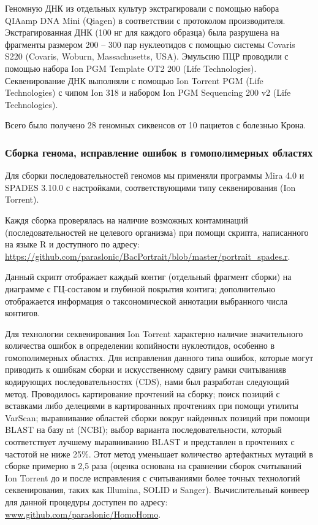 Геномную ДНК из отдельных культур экстрагировали с помощью набора QIAamp DNA Mini (Qiagen) в соответствии с протоколом производителя. Экстрагированная ДНК (100 нг для каждого образца) была разрушена на фрагменты размером 200 – 300 пар нуклеотидов с помощью системы Covaris S220 (Covaris, Woburn, Massachusetts, USA). Эмульсию ПЦР проводили с помощью набора Ion PGM Template OT2 200 (Life Technologies). Секвенирование ДНК выполняли с помощью Ion Torrent PGM (Life Technologies) с чипом Ion 318 и набором Ion PGM Sequencing 200 v2 (Life Technologies). 

Всего было получено 28 геномных сиквенсов от 10 пациетов с болезнью Крона.

\subsubsection*{Сборка генома, исправление ошибок в гомополимерных областях}
Для сборки последовательностей геномов мы применяли программы Mira 4.0 и SPADES 3.10.0 с настройками, соответствующими типу секвенирования (Ion Torrent).

Каждя сборка проверялась на наличие возможных контаминаций (последовательностей не целевого организма) при помощи скрипта, написанного на языке R и доступного по адресу: \url{https://github.com/paraslonic/BacPortrait/blob/master/portrait\_spades.r}. 

Данный скрипт отображает каждый контиг (отдельный фрагмент сборки) на диаграмме с ГЦ-составом и глубиной покрытия контига; дополнительно отображается информация о таксономической аннотации выбранного числа контигов. 

Для технологии секвенирования Ion Torrent характерно наличие значительного количества ошибок в определении копийности нуклеотидов, особенно в гомополимерных областях. Для исправления данного типа ошибок, которые могут приводить к ошибкам сборки и искусственному сдвигу рамки считыванияв кодирующих последовательностях (CDS), нами был разработан следующий метод. Проводилось картирование прочтений на сборку; поиск позиций с вставками либо делециями в картированных прочтениях при помощи утилиты VarScan; выравнивание областей сборки вокруг найденных позиций при помощи BLAST на базу nt (NCBI); выбор варианта последовательности, который соответствует лучшему выравниванию BLAST и представлен в прочтениях с частотой не ниже 25\%. Этот метод уменьшает количество артефактных мутаций в сборке примерно в 2,5 раза (оценка основана на сравнении сборок считываний Ion Torrent до и после исправления с считываниями более точных технологий секвенирования, таких как Illumina, SOLID и Sanger). Вычислительный конвеер для данной процедуры доступен по адресу: \url{www.github.com/paraslonic/HomoHomo}.


